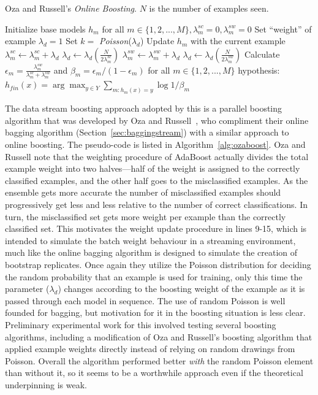 \begin{algorithm}
\caption{Oza and Russell's {\em Online Boosting}. $N$ is the number of examples seen.}
\begin{algorithmic}[1]
\STATE Initialize base models $h_{m}$ for all $m \in \{1,2,...,M\}, \lambda_{m}^{sc}=0, \lambda_{m}^{sw}=0$
\STATE Set ``weight'' of example $\lambda_{d} = 1$
\STATE Set $k = $ {\em Poisson}($\lambda_{d}$)
\STATE Update $h_{m}$ with the current example
\ENDFOR
{}
\STATE $\lambda_{m}^{sc} \gets \lambda_{m}^{sc} + \lambda_{d}$
\STATE $\lambda_{d} \gets \lambda_{d} \left( \frac{N}{2 \lambda_{m}^{sc}} \right)$
\ELSE
\STATE $\lambda_{m}^{sw} \gets \lambda_{m}^{sw} + \lambda_{d}$
\STATE $\lambda_{d} \gets \lambda_{d} \left( \frac{N}{2 \lambda_{m}^{sw}} \right)$
\ENDIF
\ENDFOR
\ENDFOR
{}
\STATE Calculate $\epsilon_{m} = \frac{\lambda_{m}^{sw}}{\lambda_{m}^{sc} + \lambda_{m}^{sw}}$ and $\beta_{m} = \epsilon_{m} / (1 - \epsilon_{m})$ for all $m \in \{1,2,...,M\}$
\RETURN hypothesis: $h_{fin}(x) = \arg \max_{y \in Y} \sum_{m:h_{m}(x)=y} \log 1 / \beta_{m}$
\end{algorithmic}
\label{alg:ozaboost}
\end{algorithm}

The data stream boosting approach adopted by this \thesis  is a parallel boosting algorithm that was developed by Oza and Russell~\cite{ozabagboost}, who compliment their online bagging algorithm (Section~\ref{sec:baggingstream}) with a similar approach to online boosting. The pseudo-code is listed in Algorithm~\ref{alg:ozaboost}.
Oza and Russell note that the weighting procedure of AdaBoost actually divides the total example weight into two halves---half of the weight is assigned to the correctly classified examples, and the other half goes to the misclassified examples. As the ensemble gets more accurate the number of misclassified examples should progressively get less and less relative to the number of correct classifications. In turn, the misclassified set gets more weight per example than the correctly classified set. This motivates the weight update procedure in lines 9-15, which is intended to simulate the batch weight behaviour in a streaming environment, much like the online bagging algorithm is designed to simulate the creation of bootstrap replicates. Once again they utilize the Poisson distribution for deciding the random probability that an example is used for training, only this time the parameter ($\lambda_{d}$) changes according to the boosting weight of the example as it is passed through each model in sequence. The use of random Poisson is well founded for bagging, but motivation for it in the boosting situation is less clear. Preliminary experimental work for this \thesis  involved testing several boosting algorithms, including a modification of Oza and Russell's boosting algorithm that applied example weights directly instead of relying on random drawings from Poisson. Overall the algorithm performed better {\em with} the random Poisson element than without it, so it seems to be a worthwhile approach even if the theoretical underpinning is weak.

